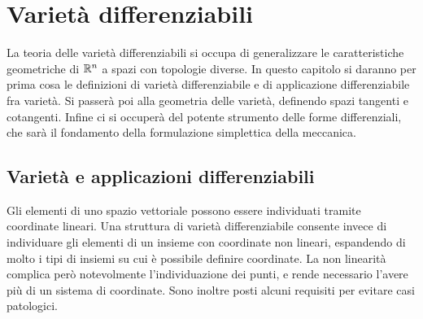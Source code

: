 \chapter{Varietà differenziabili}
La teoria delle varietà differenziabili si occupa di generalizzare le caratteristiche geometriche di $\mathbb{R}^n$ a spazi con topologie diverse. In questo capitolo si daranno per prima cosa le definizioni di varietà differenziabile e di applicazione differenziabile fra varietà. Si passerà poi alla geometria delle varietà, definendo spazi tangenti e cotangenti. Infine ci si occuperà del potente strumento delle forme differenziali, che sarà il fondamento della formulazione simplettica della meccanica.

\section{Varietà e applicazioni differenziabili}
Gli elementi di uno spazio vettoriale possono essere individuati tramite coordinate lineari. Una struttura di varietà differenziabile consente invece di individuare gli elementi di un insieme con coordinate non lineari, espandendo di molto i tipi di insiemi su cui è possibile definire coordinate. La non linearità complica però notevolmente l'individuazione dei punti, e rende necessario l'avere più di un sistema di coordinate. Sono inoltre posti alcuni requisiti per evitare casi patologici.


